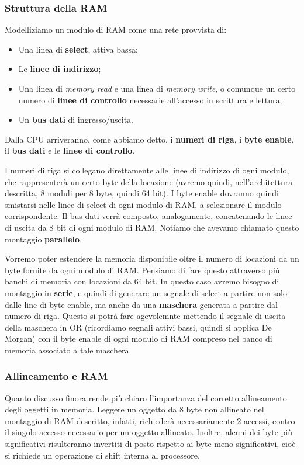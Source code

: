 \documentclass[a4paper,11pt]{article}
\begin{document}
\subsubsection{Struttura della RAM}
Modelliziamo un modulo di RAM come una rete provvista di:
\begin{itemize}
	\item Una linea di \textbf{select}, attiva bassa;
	\item Le \textbf{linee di indirizzo};
	\item Una linea di \textit{memory read} e una linea di \textit{memory write}, o comunque un certo numero di \textbf{linee di controllo} necessarie all'accesso in scrittura e lettura;
	\item Un \textbf{bus dati} di ingresso/uscita. 
\end{itemize}

Dalla CPU arriveranno, come abbiamo detto, i \textbf{numeri di riga}, i \textbf{byte enable}, il \textbf{bus dati} e le \textbf{linee di controllo}.

I numeri di riga si collegano direttamente alle linee di indirizzo di ogni modulo, che rappresenterà un certo byte della locazione (avremo quindi, nell'architettura descritta, 8 moduli per 8 byte, quindi 64 bit).
I byte enable dovranno quindi smistarsi nelle linee di select di ogni modulo di RAM, a selezionare il modulo corrispondente.
Il bus dati verrà composto, analogamente, concatenando le linee di uscita da 8 bit di ogni modulo di RAM. 
Notiamo che avevamo chiamato questo montaggio \textbf{parallelo}.

\par\smallskip 

Vorremo poter estendere la memoria disponibile oltre il numero di locazioni da un byte fornite da ogni modulo di RAM.
Pensiamo di fare questo attraverso più banchi di memoria con locazioni da 64 bit.
In questo caso avremo bisogno di montaggio in \textbf{serie}, e quindi di generare un segnale di select a partire non solo dalle line di byte enable, ma anche da una \textbf{maschera} generata a partire dal numero di riga.
Questo si potrà fare agevolemnte mettendo il segnale di uscita della maschera in OR (ricordiamo segnali attivi bassi, quindi si applica De Morgan) con il byte enable di ogni modulo di RAM compreso nel banco di memoria associato a tale maschera.

\subsubsection{Allineamento e RAM}
Quanto discusso finora rende più chiaro l'importanza del corretto allineamento degli oggetti in memoria.
Leggere un oggetto da 8 byte non allineato nel montaggio di RAM descritto, infatti, richiederà necessariamente 2 accessi, contro il singolo accesso necessario per un oggetto allineato.
Inoltre, alcuni dei byte più significativi risulteranno invertiti di posto rispetto ai byte meno significativi, cioè si richiede un operazione di shift interna al processore.
\end{document}
